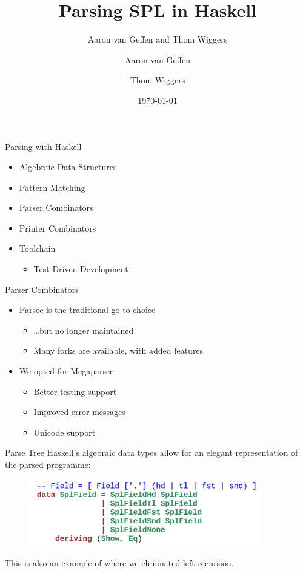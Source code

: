 \documentclass[department=icis, slidenumbers=slide, official=true]{beamerruhuisstijl}
\title{Parsing SPL in Haskell}
\subtitle{Aaron van Geffen and Thom Wiggers}
\date{\today}
\author{Aaron van Geffen \and Thom Wiggers}
\begin{document}
\begin{frame}
    \titlepage{}
\end{frame}

\begin{frame}{Parsing with Haskell}
    \begin{itemize}
        \item Algebraic Data Structures
        \item Pattern Matching
        \item Parser Combinators
        \item Printer Combinators
        \item Toolchain
            \begin{itemize}
                \item Test-Driven Development
            \end{itemize}
    \end{itemize}
\end{frame}

\begin{frame}{Parser Combinators}
    \begin{itemize}[<+->]
        \item Parsec is the traditional go-to choice
            \begin{itemize}
                \item \ldots but no longer maintained
                \item Many forks are available, with added features
            \end{itemize}
        \item We opted for Megaparsec
            \begin{itemize}
                \item Better testing support
                \item Improved error messages
                \item Unicode support
            \end{itemize}
    \end{itemize}
\end{frame}

\begin{frame}{Parse Tree}
    Haskell's algebraic data types allow for an elegant representation of the 
    parsed programme:
    \pause
    \begin{figure}[b]
        \centering
        \includegraphics[width=0.9\textwidth]{imgs/splfieldast.png}
    \end{figure}

    This is also an example of where we eliminated left recursion.
\end{frame}
\end{document}

